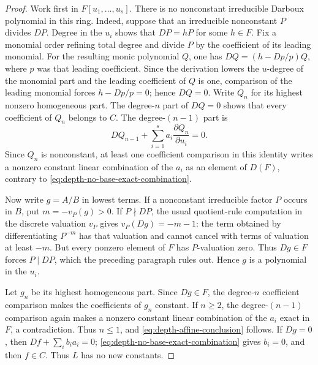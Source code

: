 \begin{proof}
Work first in \(F[u_1,\ldots,u_s]\).  There is no nonconstant
irreducible Darboux polynomial in this ring.  Indeed, suppose that an
irreducible nonconstant \(P\) divides \(DP\).  Degree in the \(u_i\)
shows that \(DP=hP\) for some \(h\in F\).  Fix a monomial order refining
total degree and divide \(P\) by the coefficient of its leading monomial.
For the resulting monic polynomial \(Q\), one has
\(DQ=(h-Dp/p)Q\), where \(p\) was that leading coefficient.  Since the
derivation lowers the \(u\)-degree of the monomial part and the leading
coefficient of \(Q\) is one, comparison of the leading monomial forces
\(h-Dp/p=0\); hence \(DQ=0\).
Write \(Q_n\) for its highest nonzero homogeneous part.  The degree-\(n\)
part of \(DQ=0\) shows that every coefficient of \(Q_n\) belongs to \(C\).
The degree-\((n-1)\) part is
\[
 DQ_{n-1}+\sum_{i=1}^s
 a_i\frac{\partial Q_n}{\partial u_i}=0.
\]
Since \(Q_n\) is nonconstant, at least one coefficient comparison in this
identity writes a nonzero constant linear combination of the \(a_i\) as
an element of \(D(F)\), contrary to
\eqref{eq:depth-no-base-exact-combination}.

Now write \(g=A/B\) in lowest terms.  If a nonconstant irreducible factor
\(P\) occurs in \(B\), put \(m=-v_P(g)>0\).  If \(P\nmid DP\), the usual
quotient-rule computation in the discrete valuation \(v_P\) gives
\(v_P(Dg)=-m-1\): the term obtained by differentiating \(P^{-m}\) has
that valuation and cannot cancel with terms of valuation at least \(-m\).
But every nonzero element of \(F\) has \(P\)-valuation zero.  Thus
\(Dg\in F\) forces \(P\mid DP\), which the preceding paragraph rules out.
Hence \(g\) is a polynomial in the \(u_i\).

Let \(g_n\) be its highest homogeneous part.  Since \(Dg\in F\), the
degree-\(n\) coefficient comparison makes the coefficients of \(g_n\)
constant.  If \(n\geq2\), the degree-\((n-1)\) comparison again makes a
nonzero constant linear combination of the \(a_i\) exact in \(F\), a
contradiction.  Thus \(n\leq1\), and
\eqref{eq:depth-affine-conclusion} follows.  If \(Dg=0\), then
\(Df+\sum_i b_i a_i=0\);
\eqref{eq:depth-no-base-exact-combination} gives \(b_i=0\), and then
\(f\in C\).  Thus \(L\) has no new constants.
\end{proof}

